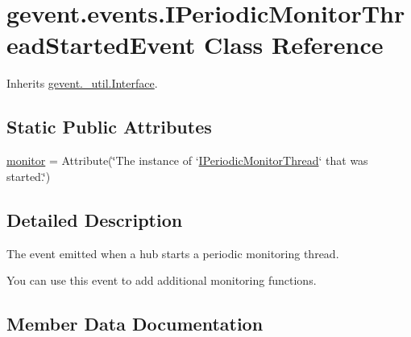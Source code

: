 \hypertarget{classgevent_1_1events_1_1_i_periodic_monitor_thread_started_event}{}\section{gevent.\+events.\+I\+Periodic\+Monitor\+Thread\+Started\+Event Class Reference}
\label{classgevent_1_1events_1_1_i_periodic_monitor_thread_started_event}


Inherits \hyperlink{classgevent_1_1__util_1_1_interface}{gevent.\+\_\+util.\+Interface}.

\subsection*{Static Public Attributes}
\begin{DoxyCompactItemize}
\item 
\hyperlink{classgevent_1_1events_1_1_i_periodic_monitor_thread_started_event_a5223e790a5d19df4b8997ba9edce177e}{monitor} = Attribute(\char`\"{}The instance of `\hyperlink{classgevent_1_1events_1_1_i_periodic_monitor_thread}{I\+Periodic\+Monitor\+Thread}` that was started.\char`\"{})
\end{DoxyCompactItemize}


\subsection{Detailed Description}
\begin{DoxyVerb}The event emitted when a hub starts a periodic monitoring thread.

You can use this event to add additional monitoring functions.
\end{DoxyVerb}
 

\subsection{Member Data Documentation}
\mbox{\label{classgevent_1_1events_1_1_i_periodic_monitor_thread_started_event_a5223e790a5d19df4b8997ba9edce177e}} 

